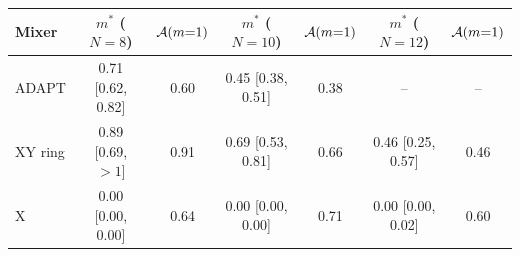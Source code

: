 \begin{tabular}{lcccccc}
\toprule
Mixer & $m^*$ ($N=8$) & $\mathcal{A}(m{=}1)$ & $m^*$ ($N=10$) & $\mathcal{A}(m{=}1)$ & $m^*$ ($N=12$) & $\mathcal{A}(m{=}1)$ \\
\midrule
ADAPT & 0.71 [0.62, 0.82] & 0.60 & 0.45 [0.38, 0.51] & 0.38 & -- & -- \\
XY ring & 0.89 [0.69, $>1$] & 0.91 & 0.69 [0.53, 0.81] & 0.66 & 0.46 [0.25, 0.57] & 0.46 \\
X & 0.00 [0.00, 0.00] & 0.64 & 0.00 [0.00, 0.00] & 0.71 & 0.00 [0.00, 0.02] & 0.60 \\
\bottomrule
\end{tabular}
